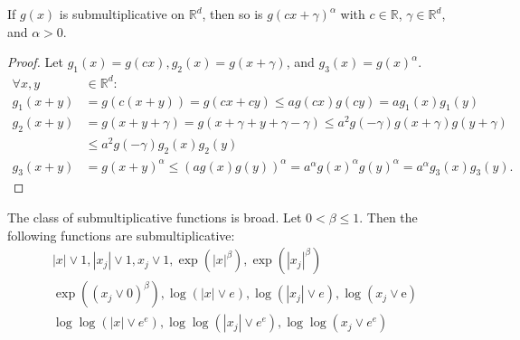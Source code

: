\documentclass[a4paper,11pt]{article}
\begin{document}
\begin{lemma}
    If $g(x)$ is submultiplicative on $\mathbb{R}^{d}$, then so is $g(c x+\gamma)^{\alpha}$
    with $c \in \mathbb{R}$, $\gamma \in \mathbb{R}^{d}$, and $\alpha>0$.
\end{lemma}

\begin{proof}
    Let $g_{1}(x)=g(c x), g_{2}(x)=g(x+\gamma)$, and $g_{3}(x)=g(x)^{\alpha}$.
    \begin{align}
        \forall x,y & \in \mathbb{R}^{d}:                                                                                                                 \\
        g_{1}(x+y)  & = g(c(x+y)) = g(c x + c y) \leq a g(c x) g(c y) = a g_{1}(x) g_{1}(y)                                                               \\
        g_{2}(x+y)  & = g(x + y + \gamma) = g(x + \gamma + y + \gamma - \gamma)
        \le a^{2} g(-\gamma) g(x+\gamma) g(y + \gamma)                                                                                                    \\
                    & \le a^{2} g(-\gamma) g_{2}( x)g_{2}(y)                                                                                              \\
        g_{3}(x+y)  & = g(x+y) ^{\alpha} \le \left(a g(x) g(y) \right) ^{\alpha}= a^{\alpha} g(x)^{\alpha} g(y)^{\alpha} = a^{\alpha} g_{3}(x) g_{3}(y) .
    \end{align}
\end{proof}

\begin{example}\label{ex:submult_func}
    The class of submultiplicative functions is broad. Let $0<\beta \leq 1$. Then the following functions are submultiplicative:
    \begin{gather}
        |x| \vee 1, \left|x_{j}\right| \vee 1, x_{j} \vee 1, \exp \left(|x|^{\beta}\right), \exp \left(\left|x_{j}\right|^{\beta}\right) \\
        \exp \left(\left(x_{j} \vee 0\right)^{\beta}\right), \log (|x| \vee e), \log \left(\left|x_{j}\right| \vee e\right), \log \left(x_{j} \vee \mathrm{e}\right) \\
        \log \log \left(|x| \vee e^{e}\right), \log \log \left(\left|x_{j}\right| \vee e^{e}\right), \log \log \left(x_{j} \vee e^{e}\right)
    \end{gather}
\end{example}
\end{document}
